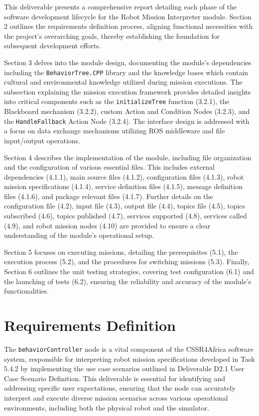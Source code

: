 \documentclass{CSSRforAfrica}
\begin{document}
This deliverable presents a comprehensive report detailing each phase of the software development lifecycle for the Robot Mission Interpreter module. Section 2 outlines the requirements definition process, aligning functional necessities with the project's overarching goals, thereby establishing the foundation for subsequent development efforts.

Section 3 delves into the module design, documenting the module's dependencies including the \texttt{\small BehaviorTree.CPP} library and the knowledge bases which contain cultural and environmental knowledge utilized during mission executions. The subsection explaining the mission execution framework provides detailed insights into critical components such as the \texttt{\small initializeTree} function (3.2.1), the Blackboard mechanism (3.2.2), custom Action and Condition Nodes (3.2.3), and the \texttt{\small HandleFallback} Action Node (3.2.4). The interface design is addressed with a focus on data exchange mechanisms utilizing ROS middleware and file input/output operations.

Section 4 describes the implementation of the module, including file organization and the configuration of various essential files. This includes external dependencies (4.1.1), main source files (4.1.2), configuration files (4.1.3), robot mission specifications (4.1.4), service definition files (4.1.5), message definition files (4.1.6), and package relevant files (4.1.7). Further details on the configuration file (4.2), input file (4.3), output file (4.4), topics file (4.5), topics subscribed (4.6), topics published (4.7), services supported (4.8), services called (4.9), and robot mission nodes (4.10) are provided to ensure a clear understanding of the module's operational setup.

Section 5 focuses on executing missions, detailing the prerequisites (5.1), the execution process (5.2), and the procedures for switching missions (5.3). Finally, Section 6 outlines the unit testing strategies, covering test configuration (6.1) and the launching of tests (6.2), ensuring the reliability and accuracy of the module's functionalities.


\newpage
\section{Requirements Definition}

The \texttt{\small behaviorController} node is a vital component of the CSSR4Africa software system, responsible for interpreting robot mission specifications developed in Task 5.4.2 by implementing the use case scenarios outlined in \textnormal{Deliverable D2.1 User Case Scenario Definition}. This deliverable is essential for identifying and addressing specific user expectations, ensuring that the node can accurately interpret and execute diverse mission scenarios across various operational environments, including both the physical robot and the simulator.
\end{document}
